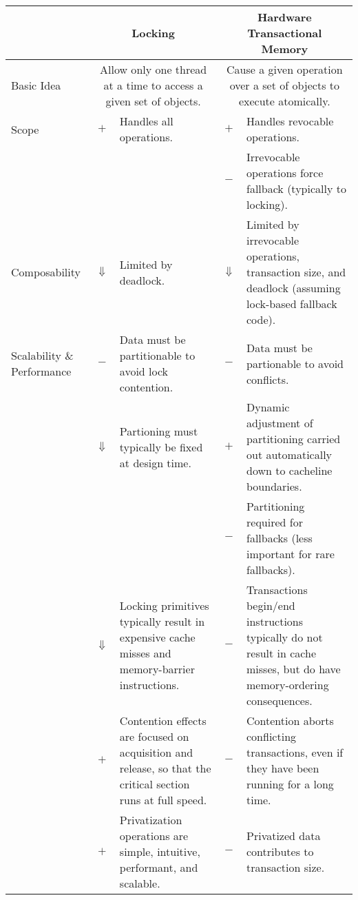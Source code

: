 
\begin{table*}[p]
\begin{center}
\small
\begin{tabular}{p{1.0in}||c|p{2.0in}||c|p{2.0in}}
& \multicolumn{2}{c||}{Locking} & \multicolumn{2}{c}{Hardware Transactional Memory} \\
\hline
\hline
Basic Idea
	& \multicolumn{2}{p{2.2in}||}{
	  Allow only one thread at a time to access a given set of objects.}
		& \multicolumn{2}{p{2.2in}}{
		  Cause a given operation over a set of objects to execute
		  atomically.} \\
\hline
\hline
Scope
	& $+$
	& Handles all operations.
		& $+$
		& Handles revocable operations. \\
\cline{4-5}
	& &
		& $-$
		& Irrevocable operations force fallback (typically
		  to locking). \\
\hline
Composability
	& $\Downarrow$
	& Limited by deadlock.
		& $\Downarrow$
		& Limited by irrevocable operations, transaction size,
		  and deadlock (assuming lock-based fallback code). \\
\hline
Scalability \& Performance
	& $-$
	& Data must be partitionable to avoid lock contention.
		& $-$
		& Data must be partionable to avoid conflicts. \\
\cline{2-5}
	& $\Downarrow$
	& Partioning must typically be fixed at design time.
		& $+$
		& Dynamic adjustment of partitioning carried out
		  automatically down to cacheline boundaries. \\
\cline{4-5}
	&
	&
		& $-$
		& Partitioning required for fallbacks (less important
		  for rare fallbacks). \\
\cline{2-5}
	& $\Downarrow$
	& Locking primitives typically result in expensive cache misses
	  and memory-barrier instructions.
		& $-$
		& Transactions begin/end instructions typically do not
		  result in cache misses, but do have memory-ordering
		  consequences. \\
\cline{2-5}
	& $+$
	& Contention effects are focused on acquisition and release, so
	  that the critical section runs at full speed.
		& $-$
		& Contention aborts conflicting transactions, even
		  if they have been running for a long time. \\
\cline{2-5}
	& $+$
	& Privatization operations are simple, intuitive, performant,
	  and scalable.
		& $-$
		& Privatized data contributes to transaction size. \\

\end{tabular}
\end{center}
\end{table*}
